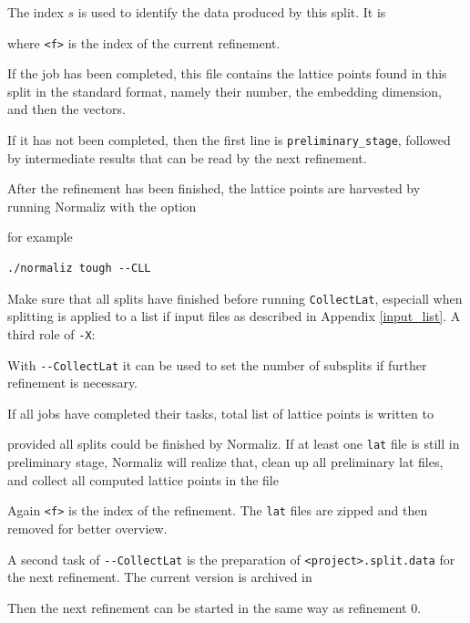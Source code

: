 The index $s$ is used to identify the data produced by this split. It is
\begin{itemize}
\end{itemize}
where \verb|<f>| is the index of the current refinement. 

If the job has been completed, this file contains the lattice points found in this split in the standard format, namely their number, the embedding dimension, and then the vectors. 

If it has not been completed, then the first line is \verb|preliminary_stage|, followed by intermediate results that can be read by the next refinement.

After the refinement has been finished, the lattice points are harvested by running Normaliz with the option
\begin{itemize}
\end{itemize}
for example
\begin{Verbatim}
./normaliz tough --CLL
\end{Verbatim}
Make sure that all splits have finished before running \verb*|CollectLat|, especiall when splitting is applied to a list if input files as described in Appendix \ref{input_list}. A third role of \verb*|-X|:
\begin{itemize}
\end{itemize}
With \verb*|--CollectLat| it can be used to set the number of subsplits if further refinement is necessary.

If all jobs have completed their tasks, total list of lattice points is written to
\begin{itemize}
\end{itemize}
provided all splits could be finished by Normaliz. If at least one \verb|lat| file is still in preliminary stage, Normaliz will realize that, clean up all preliminary lat files, and collect all computed lattice points in the file
\begin{itemize}
\end{itemize}
Again \verb*|<f>| is the index of the refinement. The \verb*|lat| files are zipped and then removed for better overview.

A second task of \verb*|--CollectLat| is the preparation of \verb*|<project>.split.data| for the next refinement. The current version is archived in
\begin{itemize}
\end{itemize}
Then the next refinement can be started in the same way as refinement $0$.

